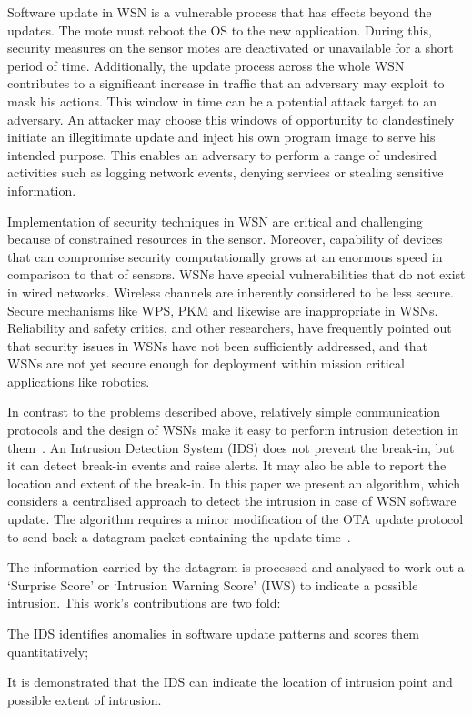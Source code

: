 \documentclass[conference,final]{IEEEtran}
\begin{document}
Software update in WSN is a vulnerable process that has
effects beyond the updates. 
The mote must reboot the OS to the new application.
During
this, security measures on the sensor motes are deactivated or
unavailable for a short period of time. Additionally, the update
process across the whole WSN contributes to a significant
increase in traffic that an adversary may exploit to mask his
actions. 
This window in time can be a potential attack target to an adversary.
An attacker may choose this windows of opportunity to clandestinely initiate
an illegitimate update and inject his own program image
to serve his intended purpose. This enables an adversary to perform a range of undesired activities 
such as logging network events, denying services or stealing sensitive information.

Implementation of security techniques in WSN are critical
and challenging because of constrained resources in the sensor.
Moreover, capability of devices that can compromise security
computationally grows at an enormous speed in comparison to
that of sensors. 
%
WSNs have special vulnerabilities
that do not exist in wired networks. Wireless channels are
inherently considered to be less secure. Secure mechanisms
like WPS, PKM and likewise are inappropriate in WSNs.
Reliability and safety critics, and other researchers, have
frequently pointed out that security issues in WSNs have not
been sufficiently addressed, and that WSNs are not yet secure
enough for deployment within mission critical applications like
robotics.

In contrast to the problems described above, relatively
simple communication protocols and the design of WSNs
make it easy to perform intrusion detection in them~\cite{quing09}.
An Intrusion Detection System (IDS) does not prevent the
break-in, but it can detect break-in events and raise alerts. It
may also be able to report the location and extent of the break-in. 
In this paper we present an algorithm, which considers a
centralised approach to detect the intrusion in case of WSN
software update. The algorithm requires a minor modification
of the OTA update protocol to send back a datagram packet
containing the update time~\cite{tep116}.

The information carried by the
datagram is processed and analysed to work out a `Surprise
Score' or `Intrusion Warning Score' (IWS) to indicate a
possible intrusion. 
This work's contributions are two fold: 
\begin{inparaenum}
\item  The IDS identifies anomalies in software update patterns
and scores them quantitatively;
\item It is demonstrated that the IDS
can indicate the location of intrusion point and possible extent
of intrusion.
\end{inparaenum}
\end{document}
